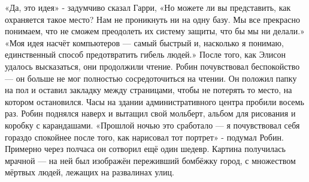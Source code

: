 \documentclass[a4paper,12pt]{book}
\begin{document}
	«Да, это идея» - задумчиво сказал Гарри,
	«Но можете ли вы представить, как охраняется такое место? Нам не проникнуть ни на одну базу. Мы все прекрасно понимаем, что не сможем преодолеть их систему защиты, что бы мы ни делали.»
	«Моя идея насчёт компьютеров — самый быстрый и, насколько я понимаю, единственный способ предотвратить гибель людей.»
	После того, как Элисон удалось высказаться, они продолжили чтение.
	Робин почувствовал беспокойство — он больше не мог полностью сосредоточиться на чтении. Он положил папку на пол и оставил закладку между страницами, чтобы не потерять то место, на котором остановился. Часы на здании административного центра пробили восемь раз. Робин поднялся наверх и вытащил свой мольберт, альбом для рисования и коробку с карандашами.
	«Прошлой ночью это сработало — я почувствовал себя гораздо спокойнее после того, как нарисовал тот портрет» - подумал Робин.
	Примерно через полчаса он сотворил ещё один шедевр. Картина получилась мрачной — на ней был изображён переживший бомбёжку город, с множеством мёртвых людей, лежащих на развалинах улиц.
\end{document}

